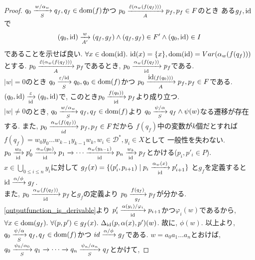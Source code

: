 \documentclass[uplatex,dvipdfmx,a4j]{jsreport}
\begin{document}
  \begin{proof}
    $q_0 \transarrow{w / \alpha_w}{S} q_f, q_f \in \dom(f)$かつ
    $p_0 \transarrow{\hat{\varepsilon}(\alpha_w(f(q_f)))}{A} p_f, p_f \in F$のとき
    ある$g_f, \id$で
    \[
      (q_0, \id) \transarrow{w}{A'} (q_f, g_f) \land (q_f, g_f) \in F' \land (q_0, \id) \in I
    \]
    であることを示せば良い.
    $\forall x \in \dom(\id).\ \id(x) = \{ x \}, \dom(\id) = Var(\alpha_w(f(q_f)))$とする.
    $p_0 \transarrow{\hat{\varepsilon}(\alpha_w(f(q_f)))}{A} p_f$であるとき,
    $p_0 \transarrow{\alpha_w(f(q_f))}{\scriptsize \id} p_f$である. \\
    $|w| = 0$のとき
    $q_0 \transarrow{\varepsilon / \scriptsize \id}{S} q_0, q_0 \in \dom(f)$かつ
    $p_0 \transarrow{\id(f(q_0)))}{A} p_f, p_f \in F$である.
    $(q_0, \id) \transarrow{\varepsilon}{\scriptsize \id} (q_0, \id)$で,
    このとき$p_0 \transarrow{f(q_0))}{\scriptsize \id} p_f$より成り立つ. \\
    $|w| \ne 0$のとき,
    $q_0 \transarrow{w / \alpha_w}{S} q_f, q_f \in \dom(f)$より
    $q_0 \transarrow{\psi / \alpha}{S} q_f \land \psi(w)$なる遷移が存在する.
    また, $p_0 \transarrow{\alpha_w(f(q_f))}{id} p_f, p_f \in F$だから
    $f(q_f)$中の変数が$k$個だとすれば
    $f(q_f) = w_0y_0 \ldots w_{k - 1}y_{k - 1}w_k, w_i \in \mathcal{D}^*, y_i \in X$として
    一般性を失わない.
    $p_0 \transarrow{w_0}{\scriptsize \id} p'_0 \transarrow{\alpha_w(y_0)}{\scriptsize \id}
    p_1 \transarrow{}{} \cdots \transarrow{\alpha_w(y_{k - 1})}{\scriptsize \id}
    p_n \transarrow{w_k}{\scriptsize \id} p_f
    $とかける($p_i, p'_i \in P$). \\
    $x \in \bigcup_{0 \leq i \le n} y_i$に対して
    $g_f(x) = \{ (p'_i, p_{i + 1}) \mid p_i \transarrow{\alpha_w(x)}{\scriptsize \id} p'_{i + 1} \}$
    と$g_f$を定義すると
    $\id \transarrow{\alpha / \phi}{} g_f$.  \\
    また, $p_0 \transarrow{\alpha_w(f(q_f))}{\scriptsize \id} p_f$と$g_f$の定義より
    $p_0 \transarrow{f(q_f)}{g_f} p_f$が分かる.
    \ref{outputfunction_is_derivable}より
    $p'_i \transarrow{\alpha(y_i) / \varphi_i}{\scriptsize \id} p_{i + 1}$かつ$\varphi_i(w)$であるから,
    $\forall x \in \dom(g_f).\ \forall (p, p') \in g_f(x).\
    \Delta_{\scriptsize \id}(p, \alpha(x), p')(w)$.
    故に, $\phi(w)$.
    以上より,
    $q_0 \transarrow{\psi / \alpha}{S} q_f, q_f \in \dom(f)$かつ
    $id \transarrow{\alpha / \phi}{} g_f$である.
    $w = a_0a_1 \ldots a_n$とおけば,
    $q_0 \transarrow{\psi_0 / \alpha_0}{S} q_1 \transarrow{}{} \cdots
    \transarrow{}{} q_n \transarrow{\psi_n / \alpha_n}{S} q_f$とかけて,

\end{proof}
\end{document}
